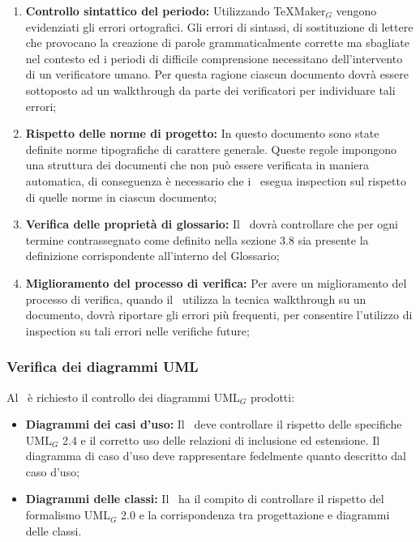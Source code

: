 \begin{enumerate}
	\item \textbf{Controllo sintattico del periodo:} Utilizzando TeXMaker$_G$ vengono
evidenziati gli errori ortografici. Gli errori di sintassi, di sostituzione di lettere che provocano la creazione di parole grammaticalmente corrette ma sbagliate nel contesto ed i periodi di difficile comprensione necessitano dell'intervento di un verificatore umano. Per questa ragione ciascun documento dovrà essere sottoposto ad un walkthrough da parte dei verificatori per individuare tali errori;
	\item \textbf{Rispetto delle norme di progetto:} In questo documento sono state definite norme tipografiche di carattere generale. Queste regole impongono una struttura dei documenti che non può essere verificata in maniera automatica, di conseguenza è necessario che i
	\ruoloVerificatore\ esegua inspection sul rispetto di quelle norme in ciascun documento;
	\item \textbf{Verifica delle proprietà di glossario:} Il \ruoloVerificatore\ dovrà controllare che per ogni termine contrassegnato come definito nella sezione 3.8 sia presente la definizione corrispondente all'interno del Glossario;
	\item \textbf{Miglioramento del processo di verifica:} Per avere un miglioramento del
processo di verifica, quando il \ruoloVerificatore\ utilizza la tecnica walkthrough su un documento, dovrà riportare gli errori più frequenti, per consentire l'utilizzo di inspection su tali errori nelle verifiche future;

\end{enumerate}

\subsubsection{Verifica dei diagrammi UML}
Al \ruoloVerificatore\ è richiesto il controllo dei diagrammi UML$_G$ prodotti:

\begin{itemize}
 	\item \textbf{Diagrammi dei casi d'uso:} Il \ruoloVerificatore\ deve controllare il rispetto delle specifiche UML$_G$ 2.4 e il corretto uso delle relazioni di inclusione ed estensione. Il diagramma di caso d'uso deve rappresentare fedelmente quanto descritto dal caso d'uso;
	\item \textbf{Diagrammi delle classi:} Il \ruoloVerificatore\ ha il compito di controllare il rispetto del formalismo UML$_G$ 2.0 e la corrispondenza tra progettazione e diagrammi delle classi.
\end{itemize}

